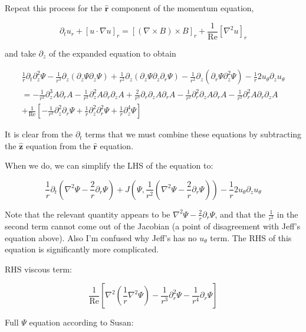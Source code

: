 \documentclass{paper}
\newcommand{\beq}{\begin{equation}}
\newcommand{\eeq}{\end{equation}}
\newcommand{\rhat}{\ensuremath{\mathbf{\hat{r}}}}
\newcommand{\zhat}{\ensuremath{\mathbf{\hat{z}}}}
\newcommand\reye{\mathrm{Re}}
\begin{document}
Repeat this process for the $\rhat$ component of the momentum equation,

\beq
\partial_t u_r + \left[u \cdot \nabla u \right]_r = \left[ \left( \nabla \times B \right) \times B \right]_r + \frac{1}{\reye}\left[ \nabla^2 u \right] _r
\eeq

and take $\partial_z$ of the expanded equation to obtain

\begin{multline}
\frac{1}{r} \partial_t \partial_z^2 \Psi - \frac{1}{r^3} \partial_z \left(\partial_z \Psi \partial_z \Psi\right) + \frac{1}{r^2} \partial_z\left(\partial_z\Psi \partial_z\partial_r \Psi\right) - \frac{1}{r^2} \partial_z \left(\partial_r \Psi \partial_z^2 \Psi\right) - \frac{1}{r} 2 u_\theta \partial_z u_\theta \\
= - \frac{1}{r^2} \partial_z^3 A \partial_r A - \frac{1}{r^2} \partial_z^2 A \partial_r \partial_z A + \frac{2}{r^3} \partial_r\partial_z A \partial_r A - \frac{1}{r^2} \partial_r^2 \partial_z A \partial_rA - \frac{1}{r^2} \partial_r^2 A \partial_r \partial_z A \\
+ \frac{1}{\reye} \left[ -\frac{1}{r^2} \partial_z^2 \partial_r \Psi + \frac{1}{r} \partial_z^2 \partial_r^2 \Psi + \frac{1}{r} \partial_z^4\Psi \right]
\end{multline}

It is clear from the $\partial_t$ terms that we must combine these equations by subtracting the $\zhat$ equation from the $\rhat$ equation.

When we do, we can simplify the LHS of the equation to:

\beq
\frac{1}{r}\partial_t \left(\nabla^2 \Psi - \frac{2}{r} \partial_r \Psi \right) + J\left(\Psi, \frac{1}{r^2} \left( \nabla^2 \Psi - \frac{2}{r} \partial_r\Psi\right) \right) - \frac{1}{r} 2 u_\theta \partial_z u_\theta
\eeq

Note that the relevant quantity appears to be $\nabla^2 \Psi - \frac{2}{r} \partial_r \Psi$, and that the $\frac{1}{r^2}$ in the second term cannot come out of the Jacobian (a point of disagreement with Jeff's equation above). Also I'm confused why Jeff's has no $u_\theta$ term. The RHS of this equation is significantly more complicated.

RHS viscous term:

\beq
\frac{1}{\reye} \left[ \nabla^2 \left(\frac{1}{r} \nabla^2 \Psi\right) - \frac{1}{r^3} \partial_r^2 \Psi - \frac{1}{r^4}\partial_r\Psi\right]
\eeq

Full $\Psi$ equation according to Susan:
\end{document}
